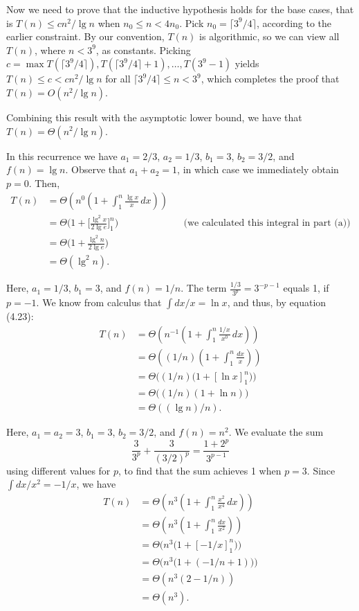 Now we need to prove that the inductive hypothesis holds for the base cases, that is $T(n)\le cn^2/\lg n$ when $n_0\le n<4n_0$.
Pick $n_0=\lceil3^9\!/4\rceil$, according to the earlier constraint.
By our convention, $T(n)$ is algorithmic, so we can view all $T(n)$, where $n<3^9$, as constants.
Picking $c=\max{T(\lceil3^9\!/4\rceil),T(\lceil3^9\!/4\rceil+1),\dots,T(3^9-1)}$ yields $T(n)\le c<cn^2/\lg n$ for all $\lceil3^9\!/4\rceil\le n<3^9$, which completes the proof that $T(n)=O(n^2/\lg n)$.

Combining this result with the asymptotic lower bound, we have that $T(n)=\Theta(n^2/\lg n)$.

\subexercise
In this recurrence we have $a_1=2/3$, $a_2=1/3$, $b_1=3$, $b_2=3/2$, and $f(n)=\lg n$.
Observe that $a_1+a_2=1$, in which case we immediately obtain $p=0$.
Then,
\begin{align*}
    T(n) &= \Theta\left(n^0\left(1+\int_1^n\frac{\lg x}{x}\,dx\right)\right) \\
    &= \Theta\biggl(1+\biggl[\frac{\lg^2x}{2\lg e}\biggr]_1^n\biggr) && \text{(we calculated this integral in part (a))} \\
    &= \Theta\biggl(1+\frac{\lg^2n}{2\lg e}\biggr) \\
    &= \Theta(\lg^2n).
\end{align*}

\subexercise
Here, $a_1=1/3$, $b_1=3$, and $f(n)=1/n$.
The term $\frac{1/3}{3^p}=3^{-p-1}$ equals 1, if $p=-1$.
We know from calculus that $\int dx/x=\ln x$, and thus, by equation (4.23):
\begin{align*}
    T(n) &= \Theta\left(n^{-1}\left(1+\int_1^n\frac{1/x}{x^0}\,dx\right)\right) \\
    &= \Theta\left((1/n)\left(1+\int_1^n\frac{dx}{x}\right)\right) \\
    &= \Theta\bigl((1/n)\bigl(1+[\ln x]_1^n\bigr)\bigr) \\
    &= \Theta\bigl((1/n)(1+\ln n)\bigr) \\
    &= \Theta((\lg n)/n).
\end{align*}

\subexercise
Here, $a_1=a_2=3$, $b_1=3$, $b_2=3/2$, and $f(n)=n^2$.
We evaluate the sum
\[
    \frac{3}{3^p}+\frac{3}{(3/2)^p} = \frac{1+2^p}{3^{p-1}}
\]
using different values for $p$, to find that the sum achieves 1 when $p=3$.
Since $\int dx/x^2=-1/x$, we have
\begin{align*}
    T(n) &= \Theta\left(n^3\left(1+\int_1^n\frac{x^2}{x^4}\,dx\right)\right) \\
    &= \Theta\left(n^3\left(1+\int_1^n\frac{dx}{x^2}\right)\right) \\
    &= \Theta\bigl(n^3\bigl(1+[-1/x]_1^n\bigr)\bigr) \\
    &= \Theta\bigl(n^3\bigl(1+(-1/n+1)\bigr)\bigr) \\
    &= \Theta(n^3(2-1/n)) \\
    &= \Theta(n^3).
\end{align*}
